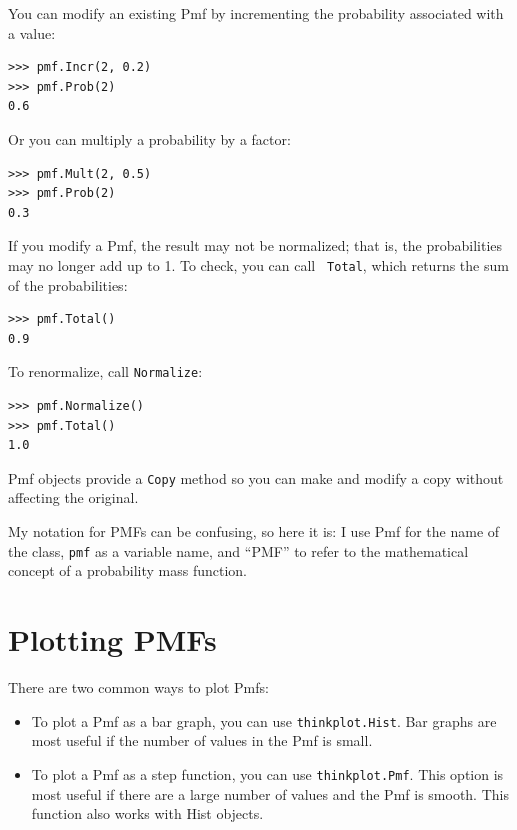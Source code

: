 \documentclass[12pt]{book}
\begin{document}
You can modify an existing Pmf by incrementing the probability
associated with a value:
%
\begin{verbatim}
>>> pmf.Incr(2, 0.2)
>>> pmf.Prob(2)
0.6
\end{verbatim}

Or you can multiply a probability by a factor:
%
\begin{verbatim}
>>> pmf.Mult(2, 0.5)
>>> pmf.Prob(2)
0.3
\end{verbatim}

If you modify a Pmf, the result may not be normalized; that is, the
probabilities may no longer add up to 1.  To check, you can call {\tt
  Total}, which returns the sum of the probabilities:
%
\begin{verbatim}
>>> pmf.Total()
0.9
\end{verbatim}

To renormalize, call {\tt Normalize}:
%
\begin{verbatim}
>>> pmf.Normalize()
>>> pmf.Total()
1.0
\end{verbatim}

Pmf objects provide a {\tt Copy} method so you can make
and modify a copy without affecting the original.

My notation for PMFs can be confusing, so here it is: I use Pmf
for the name of the class, {\tt pmf} as a variable name, and ``PMF''
to refer to the mathematical concept of a probability mass function.


\section{Plotting PMFs}

There are two common ways to plot Pmfs:

\begin{itemize}

\item To plot a Pmf as a bar graph, you can use 
{\tt thinkplot.Hist}.  Bar graphs are most useful if the number
of values in the Pmf is small.

\item To plot a Pmf as a step function, you can use
{\tt thinkplot.Pmf}.  This option is most useful if there are
a large number of values and the Pmf is smooth.  This function
also works with Hist objects.

\end{itemize}
\end{document}
